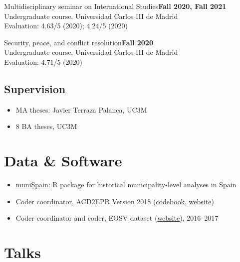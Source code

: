 \documentclass[a4paper, 12pt]{article}
\begin{document}
\noindent
Multidisciplinary seminar on International Studies\hfill\textbf{Fall 2020, Fall 2021}\\
{\small Undergraduate course, Universidad Carlos III de Madrid}\\
{\small Evaluation: 4.63/5 (2020); 4.24/5 (2020)}
\vspace{10pt}

\noindent
Security, peace, and conflict resolution\hfill\textbf{Fall 2020}\\
{\small Undergraduate course, Universidad Carlos III de Madrid}\\
{\small Evaluation: 4.71/5 (2020)}

\vspace{-10pt}
\subsection*{Supervision}

\begin{itemize}[leftmargin=*, nolistsep]
  \item MA theses: Javier Terraza Palanca, UC3M
	\item 8 BA theses, UC3M
\end{itemize}

\section*{Data \& Software}

\begin{itemize}[leftmargin=*, nolistsep]
  \item \href{https://github.com/franvillamil/muniSpain}{muniSpain}: R package for historical municipality-level analyses in Spain
	\item Coder coordinator, ACD2EPR Version 2018 (\href{https://icr.ethz.ch/data/epr/acd2epr/ACD2EPR-2018_Codebook.pdf}{codebook,} \href{https://icr.ethz.ch/data/epr/acd2epr/}{website})
	\item Coder coordinator and coder, EOSV dataset (\href{https://snis.ch/project/civilian-victimization-conflict-escalation/}{website}), 2016--2017
\end{itemize}

\newpage
\section*{Talks}
\end{document}
